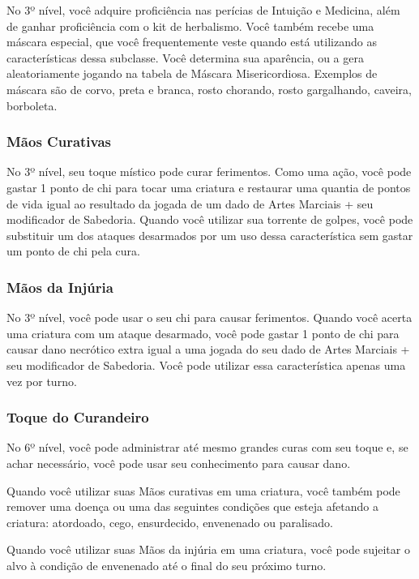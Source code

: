 \begin{multicols}{2}
No 3º nível, você adquire proficiência nas perícias de Intuição e Medicina, além
de ganhar proficiência com o kit de herbalismo. Você também recebe uma máscara
especial, que você frequentemente veste quando está utilizando as
características dessa subclasse. Você determina sua aparência, ou a gera
aleatoriamente jogando na tabela de Máscara Misericordiosa. Exemplos de máscara
são de corvo, preta e branca, rosto chorando, rosto gargalhando, caveira,
borboleta.

\subsubsection{Mãos Curativas}%
\label{ssub:maos_curativas}

No 3º nível, seu toque místico pode curar ferimentos. Como uma ação, você pode
gastar 1 ponto de chi para tocar uma criatura e restaurar uma quantia de pontos
de vida igual ao resultado da jogada de um dado de Artes Marciais + seu
modificador de Sabedoria. Quando você utilizar sua torrente de golpes, você pode
substituir um dos ataques desarmados por um uso dessa característica sem gastar
um ponto de chi pela cura.

\subsubsection*{Mãos da Injúria}%
\label{ssub:maos_da_injuria}

No 3º nível, você pode usar o seu chi para causar ferimentos. Quando você acerta
uma criatura com um ataque desarmado, você pode gastar 1 ponto de chi para
causar dano necrótico extra igual a uma jogada do seu dado de Artes Marciais +
seu modificador de Sabedoria. Você pode utilizar essa característica apenas uma
vez por turno.

\subsubsection*{Toque do Curandeiro}%
\label{ssub:toque_do_curandeiro}

No 6º nível, você pode administrar até mesmo grandes curas com seu toque e, se
achar necessário, você pode usar seu conhecimento para causar dano.

Quando você utilizar suas Mãos curativas em uma criatura, você também pode
remover uma doença ou uma das seguintes condições que esteja afetando a
criatura: atordoado, cego, ensurdecido, envenenado ou paralisado.

Quando você utilizar suas Mãos da injúria em uma criatura, você pode sujeitar o
alvo à condição de envenenado até o final do seu próximo turno.


\end{multicols}
